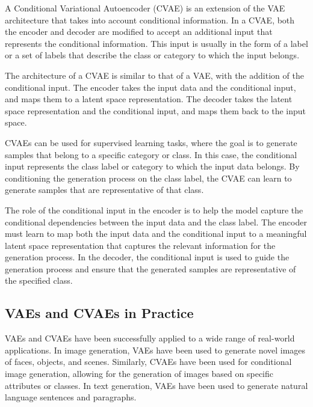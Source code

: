 
A Conditional Variational Autoencoder (CVAE) is an extension of the VAE architecture that takes into account conditional information. In a CVAE, both the encoder and decoder are modified to accept an additional input that represents the conditional information. This input is usually in the form of a label or a set of labels that describe the class or category to which the input belongs.


The architecture of a CVAE is similar to that of a VAE, with the addition of the conditional input. The encoder takes the input data and the conditional input, and maps them to a latent space representation. The decoder takes the latent space representation and the conditional input, and maps them back to the input space.

CVAEs can be used for supervised learning tasks, where the goal is to generate samples that belong to a specific category or class. In this case, the conditional input represents the class label or category to which the input data belongs. By conditioning the generation process on the class label, the CVAE can learn to generate samples that are representative of that class.

The role of the conditional input in the encoder is to help the model capture the conditional dependencies between the input data and the class label. The encoder must learn to map both the input data and the conditional input to a meaningful latent space representation that captures the relevant information for the generation process. In the decoder, the conditional input is used to guide the generation process and ensure that the generated samples are representative of the specified class.

\subsection{VAEs and CVAEs in Practice}


VAEs and CVAEs have been successfully applied to a wide range of real-world applications. In image generation, VAEs have been used to generate novel images of faces, objects, and scenes. Similarly, CVAEs have been used for conditional image generation, allowing for the generation of images based on specific attributes or classes. In text generation, VAEs have been used to generate natural language sentences and paragraphs.

